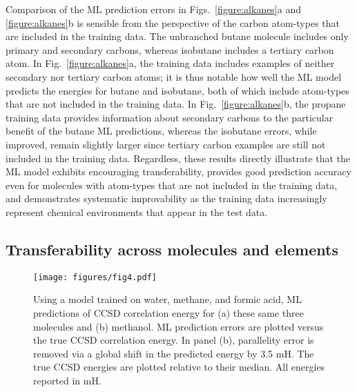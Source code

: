 \documentclass[%
 aps,
 prb,
 twocolumn,
%
 reprint,%
%
citeautoscript,
%
showkeys
]{revtex4-1}
\begin{document}
Comparison of the ML prediction errors in Figs.~\ref{figure:alkanes}a and \ref{figure:alkanes}b is sensible from the perspective of the carbon atom-types that are included in the training data.  The unbranched butane molecule includes only primary and secondary carbons, whereas isobutane includes a tertiary carbon atom.  In Fig.~\ref{figure:alkanes}a, the training data includes examples of neither secondary nor tertiary carbon atoms; it is thus notable how well the ML model predicts the energies for butane and isobutane, both of which include atom-types that are not included in the training data.  In Fig.~\ref{figure:alkanes}b, the propane training data provides information about secondary carbons to the particular benefit of the butane ML predictions, whereas the isobutane errors, while improved,
remain slightly larger since tertiary carbon examples are still not included in the training data.  Regardless, these results directly illustrate that the ML model exhibits encouraging transferability, 
provides good prediction accuracy even for molecules with atom-types that are not included in the training data,
and demonstrates systematic improvability as the training data increasingly represent chemical environments that appear in the test data.


%

%

%
%

%

%
%
%
%
%
%
%
%
%
%
%
%
%

%
%
%

%
%
%
%
%
%
%

%

%
%
%
%
%
%

%
%

\subsection{Transferability across molecules and elements}

\begin{figure}[htbp]
\texttt{[image: figures/fig4.pdf]}
\caption{
%
%
%
%
Using a model trained on water, methane, and formic acid, ML predictions of CCSD correlation energy for (a) these same three molecules and (b) methanol. 
%
%
ML prediction errors are plotted versus the true CCSD correlation energy.
In panel (b), parallelity error is removed via a global shift in the predicted energy by 3.5 mH.
The true CCSD energies are plotted relative to their median. All energies reported in mH.
}
\label{figure:methanol}
\end{figure}
\end{document}
